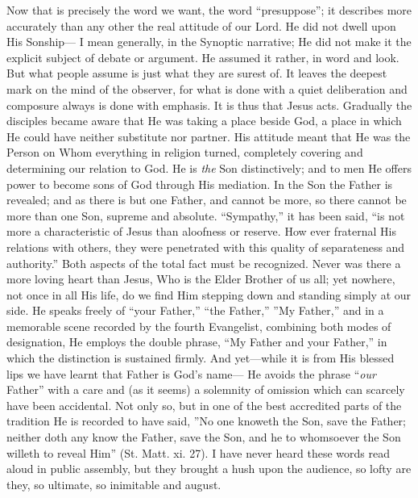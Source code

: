 \documentclass[12pt,a5paper,oneside]{book}
\begin{document}
Now that is precisely the word we want, the
word ``presuppose''; it describes more accurately 
than any other the real attitude of our
Lord. He did not dwell upon His Sonship---
I mean generally, in the Synoptic narrative;
He did not make it the explicit subject of
debate or argument. He assumed it rather,
in word and look. But what people assume
is just what they are surest of. It leaves
the deepest mark on the mind of the
observer, for what is done with a quiet
deliberation and composure always is done
with emphasis. It is thus that Jesus acts.
Gradually the disciples became aware that He
was taking a place beside God, a place in which
He could have neither substitute nor partner.
His attitude meant that He was the Person
on Whom everything in religion turned, completely 
covering and determining our relation
to God. He is \textit{the} Son distinctively; and to
men He offers power to become sons of God
through His mediation. In the Son the Father
is revealed; and as there is but one Father, and
cannot be more, so there cannot be more than
one Son, supreme and absolute. ``Sympathy,''
it has been said, ``is not more a characteristic 
of Jesus than aloofness or reserve. How
ever fraternal His relations with others, they
were penetrated with this quality of separateness
and authority.'' Both aspects of the total
fact must be recognized. Never was there
a more loving heart than Jesus, Who is the
Elder Brother of us all; yet nowhere, not
once in all His life, do we find Him stepping
down and standing simply at our side. He
speaks freely of ``your Father,'' ``the Father,''
''My Father,'' and in a memorable scene recorded 
by the fourth Evangelist, combining
both modes of designation, He employs the
double phrase, ``My Father and your Father,''
in which the distinction is sustained firmly.
And yet---while it is from His blessed lips we
have learnt that Father is God's name---
He avoids the phrase ``\textit{our} Father'' with a
care and (as it seems) a solemnity of omission
which can scarcely have been accidental. Not
only so, but in one of the best accredited parts
of the tradition He is recorded to have said,
''No one knoweth the Son, save the Father;
neither doth any know the Father, save the Son,
and he to whomsoever the Son willeth to reveal
Him''
(St. Matt. xi. 27). I have never heard
these words read aloud in public assembly, but
they brought a hush upon the audience, so lofty
are they, so ultimate, so inimitable and august.
\end{document}
